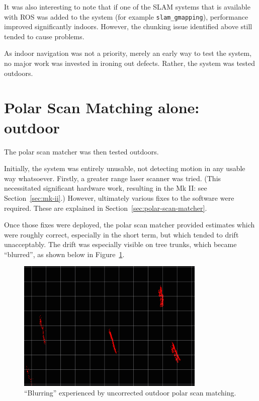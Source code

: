 \documentclass[12pt,oneside,a4paper,draft]{book}
\begin{document}
It was also interesting to note that if one of the SLAM systems that
is available with ROS was added to the system (for example
\texttt{slam\_gmapping}), performance improved significantly
indoors. However, the chunking issue identified above still tended to
cause problems.

As indoor navigation was not a priority, merely an early way to test
the system, no major work was invested in ironing out defects. Rather,
the system was tested outdoors.

\section{Polar Scan Matching alone: outdoor}
\label{sec:psm-outdoor}

The polar scan matcher was then tested outdoors.

Initially, the system was entirely unusable, not detecting motion in
any usable way whatsoever. Firstly, a greater range laser scanner was
tried. (This necessitated significant hardware work, resulting in the
Mk II: see Section~\ref{sec:mk-ii}.) However, ultimately various fixes
to the software were required. These are explained in
Section~\ref{sec:polar-scan-matcher}.

Once those fixes were deployed, the polar scan matcher provided
estimates which were roughly correct, especially in the short term,
but which tended to drift unacceptably. The drift was especially
visible on tree trunks, which became ``blurred'', as shown below in
Figure~\ref{fig:blur-detailed}. 

\begin{figure}[h!]
  \centering
  \includegraphics[width=0.8\textwidth]{figs/blurring}
  \caption{``Blurring'' experienced by uncorrected outdoor polar scan matching.}
  \label{fig:blur-detailed}
\end{figure}
\end{document}
